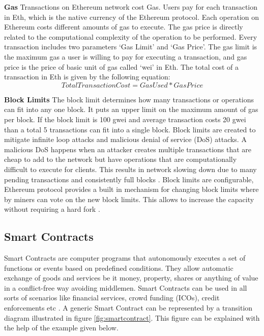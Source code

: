 \textbf{Gas}
Transactions on Ethereum network cost Gas. Users pay for each transaction in Eth, which is the native currency of the Ethereum protocol. Each operation on Ethereum costs different amounts of gas to execute. The gas price is directly related to the computational complexity of the operation to be performed. Every transaction includes two parameters ‘Gas Limit’ and ‘Gas Price’.  The gas limit is the maximum gas a user is willing to pay for executing a transaction, and gas price is the price of basic unit of gas called ‘wei’ in Eth. The total cost of a transaction in Eth is given by the following equation: \cite{eth:001}
\[ Total Transaction Cost = GasUsed * GasPrice \]

\textbf{Block Limits}
The block limit determines how many transactions or operations can fit into any one block. It puts an upper limit on the maximum amount of gas per block. If the block limit is 100 gwei and average transaction costs 20 gwei than a total 5 transactions can fit into a single block. Block limits are created to mitigate infinite loop attacks and malicious denial of service (DoS) attacks. A malicious DoS happens when an attacker creates multiple transactions that are cheap to add to the network but have operations that are computationally difficult to execute for clients. This results in network slowing down due to many pending transactions and consistently full blocks \cite{misc:026}. Block limits are configurable, Ethereum protocol provides a built in mechanism for changing block limits where by miners can vote on the new block limits. This allows to increase the capacity without requiring a hard fork \cite{eth:001}.
 
\vspace{0.5cm}
\subsection{Smart Contracts}
Smart Contracts are computer programs that autonomously executes a set of functions or events based on predefined conditions. They allow automatic exchange of goods and services be it money, property, shares or anything of value in a conflict-free way avoiding middlemen. Smart Contracts can be used in all sorts of scenarios like financial services, crowd funding (ICOs), credit enforcements etc \cite{paper:009}. A generic Smart Contract can be represented by a transition diagram illustrated in figure \ref{fig:smartcontract}. This figure can be explained with the help of the example given below.
 
